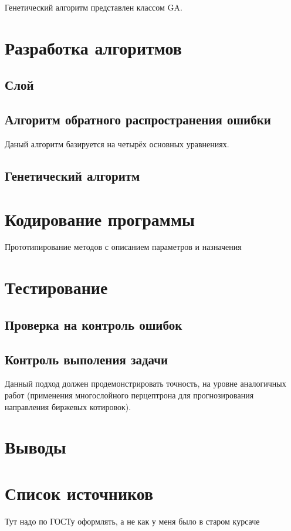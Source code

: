 \documentclass[a4paper,12pt]{article}
\begin{document}
Генетический алгоритм представлен классом GA.

\newpage\section{Разработка алгоритмов}

\subsection{Слой}

\subsection{Алгоритм обратного распространения ошибки}
Даный алгоритм базируется на четырёх основных уравнениях.

\subsection{Генетический алгоритм}

\newpage\section{Кодирование программы}
Прототипирование методов с описанием параметров и назначения

\newpage\section{Тестирование}
\subsection{Проверка на контроль ошибок}
\subsection{Контроль выполения задачи}
Данный подход должен продемонстрировать точность, на уровне аналогичных работ (применения многослойного перцептрона для прогнозирования направления биржевых котировок).

\newpage\section*{Выводы}

\newpage\section*{Список источников}
Тут надо по ГОСТу оформлять, а не как у меня было в старом курсаче
\end{document}
